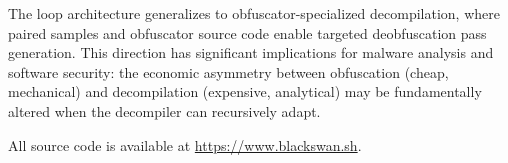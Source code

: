 \documentclass[conference,11pt]{IEEEtran}
\begin{document}
The loop architecture generalizes to obfuscator-specialized decompilation, where paired samples and obfuscator source code enable targeted deobfuscation pass generation. This direction has significant implications for malware analysis and software security: the economic asymmetry between obfuscation (cheap, mechanical) and decompilation (expensive, analytical) may be fundamentally altered when the decompiler can recursively adapt.

All source code is available at \url{https://www.blackswan.sh}.




\end{document}
